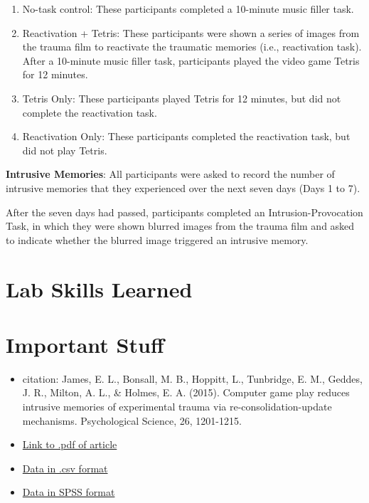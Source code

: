\documentclass[]{book}
\providecommand{\tightlist}{%
  \setlength{\itemsep}{0pt}\setlength{\parskip}{0pt}}
\theoremstyle{definition}
\theoremstyle{definition}
\theoremstyle{definition}
\theoremstyle{remark}
\begin{document}
\begin{enumerate}
\def\labelenumi{\arabic{enumi}.}
\tightlist
\item
  No-task control: These participants completed a 10-minute music filler
  task.
\item
  Reactivation + Tetris: These participants were shown a series of
  images from the trauma film to reactivate the traumatic memories
  (i.e., reactivation task). After a 10-minute music filler task,
  participants played the video game Tetris for 12 minutes.
\item
  Tetris Only: These participants played Tetris for 12 minutes, but did
  not complete the reactivation task.
\item
  Reactivation Only: These participants completed the reactivation task,
  but did not play Tetris.
\end{enumerate}

\textbf{Intrusive Memories}: All participants were asked to record the
number of intrusive memories that they experienced over the next seven
days (Days 1 to 7).

After the seven days had passed, participants completed an
Intrusion-Provocation Task, in which they were shown blurred images from
the trauma film and asked to indicate whether the blurred image
triggered an intrusive memory.

\section{Lab Skills Learned}\label{lab-skills-learned-2}

\section{Important Stuff}\label{important-stuff-2}

\begin{itemize}
\tightlist
\item
  citation: James, E. L., Bonsall, M. B., Hoppitt, L., Tunbridge, E. M.,
  Geddes, J. R., Milton, A. L., \& Holmes, E. A. (2015). Computer game
  play reduces intrusive memories of experimental trauma via
  re-consolidation-update mechanisms. Psychological Science, 26,
  1201-1215.
\item
  \href{http://journals.sagepub.com/stoken/default+domain/hQ2W4fbPrZVJ7eyNJaqu/full}{Link
  to .pdf of article}
\item
  \href{https://drive.google.com/open?id=0Bz-rhZ21ShvOM1cxWUpUNlQ0UlE}{Data
  in .csv format}
\item
  \href{https://drive.google.com/file/d/0Bz-rhZ21ShvOZ1lvQ0dQekZGWU0/view?usp=sharing}{Data
  in SPSS format}
\end{itemize}
\end{document}
